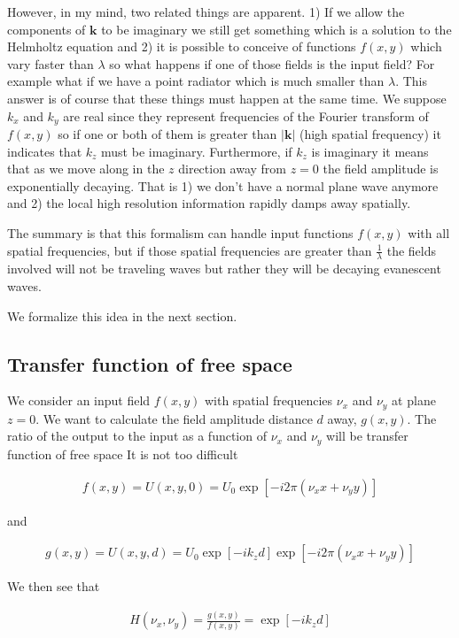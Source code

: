 \documentclass[12pt]{article}
\newcommand{\bv}[1]{\mathbf{#1}}
\begin{document}
However, in my mind, two related things are apparent. 1) If we allow the components of $\bv{k}$ to be imaginary we still get something which is a solution to the Helmholtz equation and 2) it is possible to conceive of functions $f(x,y)$ which vary faster than $\lambda$ so what happens if one of those fields is the input field? For example what if we have a point radiator which is much smaller than $\lambda$. This answer is of course that these things must happen at the same time. We suppose $k_x$ and $k_y$ are real since they represent frequencies of the Fourier transform of $f(x,y)$ so if one or both of them is greater than $|\bv{k}|$ (high spatial frequency) it indicates that $k_z$ must be imaginary. Furthermore, if $k_z$ is imaginary it means that as we move along in the $z$ direction away from $z=0$ the field amplitude is exponentially decaying. That is 1) we don't have a normal plane wave anymore and 2) the local high resolution information rapidly damps away spatially.

The summary is that this formalism can handle input functions $f(x,y)$ with all spatial frequencies, but if those spatial frequencies are greater than $\frac{1}{\lambda}$ the fields involved will not be traveling waves but rather they will be decaying evanescent waves.

We formalize this idea in the next section.

\subsection{Transfer function of free space}

We consider an input field $f(x,y)$ with spatial frequencies $\nu_x$ and $\nu_y$ at plane $z=0$. We want to calculate the field amplitude distance $d$ away, $g(x,y)$. The ratio of the output to the input as a function of $\nu_x$ and $\nu_y$ will be transfer function of free space It is not too difficult

\begin{align}
f(x,y) = U(x,y,0) = U_0 \exp[-i 2\pi (\nu_x x + \nu_y y)]
\end{align}

and

\begin{align}
g(x,y) = U(x,y,d) = U_0 \exp[-i k_z d]\exp[-i 2\pi (\nu_x x + \nu_y y)]
\end{align}

We then see that

\begin{align}
H(\nu_x,\nu_y) = \frac{g(x,y)}{f(x,y)} = \exp[-i k_z d]
\end{align}
\end{document}
